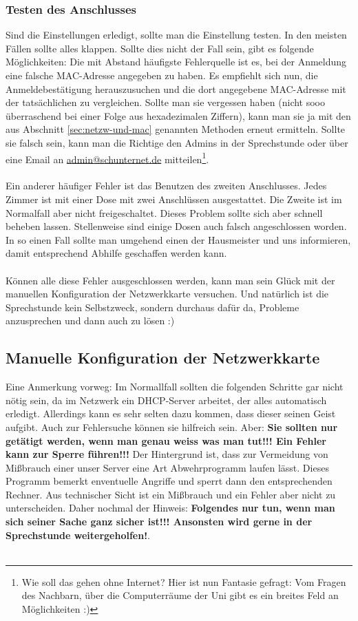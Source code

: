 \subsubsection{Testen des Anschlusses}
Sind die Einstellungen erledigt, sollte man die Einstellung
testen. In den meisten Fällen sollte alles klappen. Sollte dies nicht
der Fall sein, gibt es folgende Möglichkeiten: Die mit Abstand
häufigste Fehlerquelle ist es, bei der Anmeldung eine falsche
MAC-Adresse angegeben zu haben. Es empfiehlt sich nun, die
Anmeldebestätigung herauszusuchen und die dort angegebene MAC-Adresse
mit der tatsächlichen zu vergleichen. Sollte man sie vergessen haben
(nicht sooo überraschend bei einer Folge aus hexadezimalen Ziffern),
kann man sie ja mit den aus Abschnitt \ref{sec:netzw-und-mac}
genannten Methoden erneut ermitteln. Sollte sie falsch sein, kann man
die Richtige den Admins in der Sprechstunde oder über eine Email an
\url{admin@schunternet.de} mitteilen\footnote{Wie soll das gehen ohne
  Internet? Hier ist nun Fantasie gefragt: Vom Fragen des Nachbarn,
  über die Computerräume der Uni gibt es ein breites Feld an
  Möglichkeiten :)}.\\\\
Ein anderer häufiger Fehler ist das Benutzen des zweiten
Anschlusses. Jedes Zimmer ist mit einer Dose mit zwei Anschlüssen
ausgestattet. Die Zweite ist im Normalfall aber nicht
freigeschaltet. Dieses Problem sollte sich aber schnell beheben
lassen. Stellenweise sind einige Dosen auch falsch angeschlossen
worden. In so einen Fall sollte man umgehend einen der Hausmeister und
uns informieren, damit entsprechend Abhilfe geschaffen werden
kann.\\\\
Können alle diese Fehler ausgeschlossen werden, kann man sein Glück
mit der manuellen Konfiguration der Netzwerkkarte versuchen. Und
natürlich ist die Sprechstunde kein Selbstzweck, sondern durchaus
dafür da, Probleme anzusprechen und dann auch zu lösen :)

\subsection{Manuelle Konfiguration der Netzwerkkarte}
Eine Anmerkung vorweg: Im Normallfall sollten die folgenden Schritte
gar nicht nötig sein, da im Netzwerk ein DHCP-Server arbeitet, der
alles automatisch erledigt. Allerdings kann es sehr selten dazu
kommen, dass dieser seinen Geist aufgibt. Auch zur Fehlersuche können
sie hilfreich sein. Aber: \textbf{\Large Sie sollten nur getätigt werden, wenn man
genau weiss was man tut!!! Ein Fehler kann zur Sperre führen!!!} Der
Hintergrund ist, dass zur Vermeidung von Mißbrauch einer unser Server
eine Art Abwehrprogramm laufen lässt. Dieses Programm bemerkt
 enventuelle Angriffe und sperrt dann den entsprechenden
Rechner. Aus technischer Sicht ist ein Mißbrauch und ein Fehler aber
nicht zu unterscheiden. Daher nochmal der Hinweis: \textbf{\Large Folgendes nur
  tun, wenn man sich seiner Sache ganz sicher ist!!! Ansonsten wird
  gerne in der Sprechstunde weitergeholfen!}.\\\\

